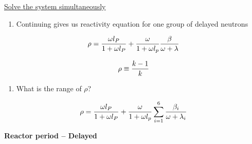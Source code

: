 \documentclass[aspectratio=1610,pdftex,dvipsnames,compress,xcolor={dvipsnames}]{beamer}
\begin{document}
\begin{frame}{\href{https://uidaho.pressbooks.pub/nuclearengineering/chapter/math-skills/}{Solve the system simultaneously}}
    \begin{enumerate}[series=outerlist,topsep=0pt,itemsep=21pt,leftmargin=*,label=(\arabic*)]
        \item[]Continuing gives us reactivity equation for one group of delayed neutrons
    \end{enumerate}

    \vspace*{\fill}

    \begin{equation}
        \LARGE
        \rho = \frac{\omega l_P}{1+\omega l_P} + \frac{\omega}{1+\omega l_p} \frac{\beta}{\omega+\lambda}
    \end{equation}

    \begin{equation}
        \LARGE
        \rho \equiv \frac{k-1}{k}
    \end{equation}

    \vspace*{\fill}

    \begin{enumerate}[series=outerlist,topsep=0pt,itemsep=21pt,leftmargin=*,label=(\arabic*)]
        \item[]What is the range of $\rho$?
    \end{enumerate}

    \vspace*{\fill}

    \begin{equation}
        \LARGE
        \rho = \frac{\omega l_P}{1 + \omega l_P} + \frac{\omega}{1 + \omega l_p} \sum_{i=1}^6 {\frac{\beta_i}{\omega + \lambda_i}}
    \end{equation}
\end{frame}


\begin{frame}[plain]{}
    \centering\LARGE\textbf{Reactor period -- Delayed}
\end{frame}
\end{document}
